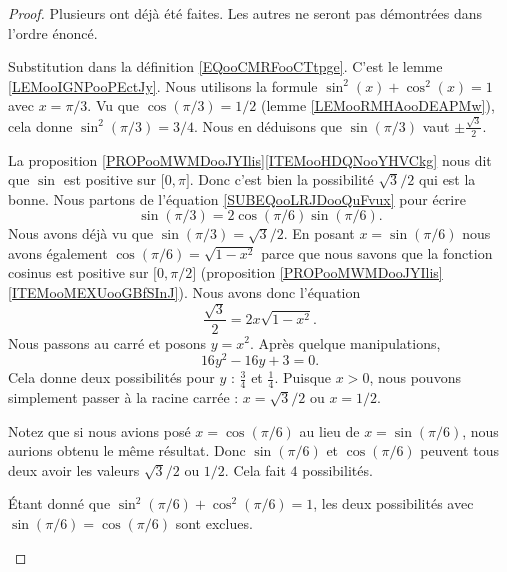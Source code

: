 \begin{proof}
	Plusieurs ont déjà été faites. Les autres ne seront pas démontrées dans l'ordre énoncé.
	\begin{subproof}
		\spitem[\( \sin(0)=0\)]
		Substitution dans la définition \eqref{EQooCMRFooCTtpge}.
		\spitem[\(  \sin(\pi/4)=\sqrt{ 2 }/2\)]
		C'est le lemme \ref{LEMooIGNPooPEctJy}.
		\spitem[\(  \sin(\pi/3)=1/\sqrt{ 2 }\)]
		Nous utilisons la formule \( \sin^2(x)+\cos^2(x)=1\) avec \( x=\pi/3\). Vu que \( \cos(\pi/3)=1/2\) (lemme \ref{LEMooRMHAooDEAPMw}), cela donne \( \sin^2(\pi/3)=3/4\). Nous en déduisons que \( \sin(\pi/3)\) vaut \( \pm\frac{\sqrt{3}}{  2 }\).

		La proposition \ref{PROPooMWMDooJYIlis}\ref{ITEMooHDQNooYHVCkg} nous dit que \( \sin\) est positive sur \(\mathopen[ 0 , \pi \mathclose]\). Donc c'est bien la possibilité \( \sqrt{3}/ 2\) qui est la bonne.
		\spitem[\( \sin(\pi/6)=1/2\) et \( \cos(\pi/6)=\sqrt{ 3 }/2 \)]
		Nous partons de l'équation \eqref{SUBEQooLRJDooQuFvux} pour écrire
		\begin{equation}
			\sin(\pi/3)=2\cos(\pi/6)\sin(\pi/6).
		\end{equation}
		Nous avons déjà vu que \( \sin(\pi/3)=\sqrt{ 3 }/2\). En posant \( x=\sin(\pi/6)\) nous avons également \( \cos(\pi/6)=\sqrt{ 1-x^2 }\) parce que nous savons que la fonction cosinus est positive sur \( \mathopen[ 0 , \pi/2 \mathclose]\) (proposition \ref{PROPooMWMDooJYIlis}\ref{ITEMooMEXUooGBfSInJ}). Nous avons donc l'équation
		\begin{equation}
			\frac{ \sqrt{ 3 } }{2}=2x\sqrt{ 1-x^2 }.
		\end{equation}
		Nous passons au carré et posons \( y=x^2\). Après quelque manipulations,
		\begin{equation}
			16y^2-16y+3=0.
		\end{equation}
		Cela donne deux possibilités pour \( y\) : \( \frac{ 3 }{ 4 }\) et \( \frac{1}{ 4 }\). Puisque \( x>0\), nous pouvons simplement passer à la racine carrée : \( x=\sqrt{ 3 }/2\) ou \( x=1/2\).

		Notez que si nous avions posé \( x=\cos(\pi/6)\) au lieu de \( x=\sin(\pi/6)\), nous aurions obtenu le même résultat. Donc \( \sin(\pi/6)\) et \( \cos(\pi/6)\) peuvent tous deux avoir les valeurs \( \sqrt{ 3 }/2\) ou \( 1/2\). Cela fait \( 4\) possibilités.

		Étant donné que \( \sin^2(\pi/6)+\cos^2(\pi/6)=1\), les deux possibilités avec \( \sin(\pi/6)=\cos(\pi/6)\) sont exclues.


\end{subproof}
\end{proof}
